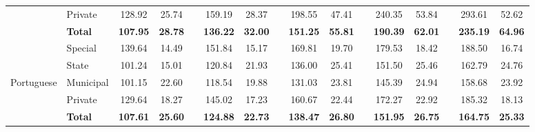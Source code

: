 \documentclass[a4paper, 12pt]{article}
\begin{document}
\begin{table}[H]
\begin{adjustbox}{width=1\textwidth}
\begin{tabular}{llllllllllllllll}
          & Private & \multicolumn{1}{c}{128.92} & \multicolumn{1}{c}{25.74} &       & \multicolumn{1}{c}{159.19} & \multicolumn{1}{c}{28.37} &       & \multicolumn{1}{c}{198.55} & \multicolumn{1}{c}{47.41} &       & \multicolumn{1}{c}{240.35} & \multicolumn{1}{c}{53.84} &       & \multicolumn{1}{c}{293.61} & \multicolumn{1}{c}{52.62} \\
\cmidrule{2-16}          & \textbf{Total} & \multicolumn{1}{c}{\textbf{107.95}} & \multicolumn{1}{c}{\textbf{28.78}} &       & \multicolumn{1}{c}{\textbf{136.22}} & \multicolumn{1}{c}{\textbf{32.00}} &       & \multicolumn{1}{c}{\textbf{151.25}} & \multicolumn{1}{c}{\textbf{55.81}} &       & \multicolumn{1}{c}{\textbf{190.39}} & \multicolumn{1}{c}{\textbf{62.01}} &       & \multicolumn{1}{c}{\textbf{235.19}} & \multicolumn{1}{c}{\textbf{64.96}} \\
    \midrule
          & Special & \multicolumn{1}{c}{139.64} & \multicolumn{1}{c}{14.49} &       & \multicolumn{1}{c}{151.84} & \multicolumn{1}{c}{15.17} &       & \multicolumn{1}{c}{169.81} & \multicolumn{1}{c}{19.70} &       & \multicolumn{1}{c}{179.53} & \multicolumn{1}{c}{18.42} &       & \multicolumn{1}{c}{188.50} & \multicolumn{1}{c}{16.74} \\
          & State & \multicolumn{1}{c}{101.24} & \multicolumn{1}{c}{15.01} &       & \multicolumn{1}{c}{120.84} & \multicolumn{1}{c}{21.93} &       & \multicolumn{1}{c}{136.00} & \multicolumn{1}{c}{25.41} &       & \multicolumn{1}{c}{151.50} & \multicolumn{1}{c}{25.46} &       & \multicolumn{1}{c}{162.79} & \multicolumn{1}{c}{24.76} \\
    Portuguese & Municipal & \multicolumn{1}{c}{101.15} & \multicolumn{1}{c}{22.60} &       & \multicolumn{1}{c}{118.54} & \multicolumn{1}{c}{19.88} &       & \multicolumn{1}{c}{131.03} & \multicolumn{1}{c}{23.81} &       & \multicolumn{1}{c}{145.39} & \multicolumn{1}{c}{24.94} &       & \multicolumn{1}{c}{158.68} & \multicolumn{1}{c}{23.92} \\
          & Private & \multicolumn{1}{c}{129.64} & \multicolumn{1}{c}{18.27} &       & \multicolumn{1}{c}{145.02} & \multicolumn{1}{c}{17.23} &       & \multicolumn{1}{c}{160.67} & \multicolumn{1}{c}{22.44} &       & \multicolumn{1}{c}{172.27} & \multicolumn{1}{c}{22.92} &       & \multicolumn{1}{c}{185.32} & \multicolumn{1}{c}{18.13} \\
\cmidrule{2-16}          & \textbf{Total} & \multicolumn{1}{c}{\textbf{107.61}} & \multicolumn{1}{c}{\textbf{25.60}} &       & \multicolumn{1}{c}{\textbf{124.88}} & \multicolumn{1}{c}{\textbf{22.73}} &       & \multicolumn{1}{c}{\textbf{138.47}} & \multicolumn{1}{c}{\textbf{26.80}} &       & \multicolumn{1}{c}{\textbf{151.95}} & \multicolumn{1}{c}{\textbf{26.75}} &       & \multicolumn{1}{c}{\textbf{164.75}} & \multicolumn{1}{c}{\textbf{25.33}} \\
    \bottomrule
     \end{tabular}%
 \end{adjustbox}
\end{table}%
\end{document}
